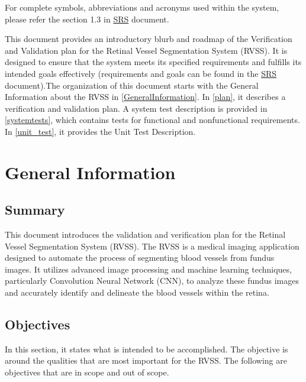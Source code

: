 \documentclass[12pt, titlepage]{article}
\begin{document}
For complete symbols, abbreviations and acronyms used within the system, please refer the section 1.3 in \href{https://github.com/lele0007/Blood-vessel-segmentation/blob/main/docs/SRS/SRS.pdf}{SRS} document.


\newpage

This document provides an introductory blurb and roadmap of the Verification and Validation plan for the Retinal Vessel Segmentation System (RVSS). It is designed to ensure that the system meets its specified requirements and fulfills its intended goals effectively (requirements and goals can be found in the \href{https://github.com/lele0007/Blood-vessel-segmentation/blob/main/docs/SRS/SRS.pdf}{SRS} document).The organization of this document starts with the General
Information about the RVSS in \autoref{GeneralInformation}. In  \autoref{plan}, it describes a verification and validation plan.  A system test description is provided in \autoref{systemtests}, which contains tests for functional and nonfunctional requirements. In \autoref{unit_test}, it provides the Unit Test Description.  



\section{General Information}
\label{GeneralInformation}

\subsection{Summary}
This document introduces the validation and verification plan for
the Retinal Vessel Segmentation System (RVSS). The RVSS is a medical imaging application designed to automate the process of segmenting blood vessels from fundus images. It utilizes advanced image processing and machine learning techniques, particularly Convolution Neural Network (CNN), to analyze these fundus images and accurately identify and delineate the blood vessels within the retina.

\subsection{Objectives}
In this section, it states what is intended to be accomplished. The objective is around the qualities that are most important for the RVSS. The following are objectives that are in scope and out of scope.
\end{document}
